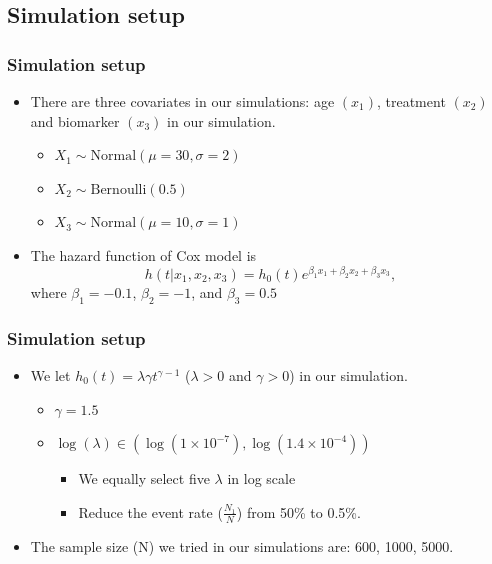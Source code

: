 \documentclass{beamer}
\begin{document}
\subsection{Simulation setup}
	\begin{frame}
		\frametitle{Simulation setup}

      \begin{itemize}
          \item There are three covariates in our simulations: age $(x_1)$, treatment $(x_2)$ and biomarker $(x_3)$ in our simulation.
          \begin{itemize}
              \item $X_1 \sim \mathrm{Normal}(\mu = 30, \sigma = 2)$
              \item $X_2 \sim \mathrm{Bernoulli}(0.5)$   \hspace*{\fill}\\         
              \item $X_3 \sim \mathrm{Normal}(\mu = 10, \sigma = 1)$
          \end{itemize}
      \end{itemize}
      \begin{itemize}
          \item The hazard function of Cox model is 
          \begin{equation*}
              h(t|x_1, x_2, x_3) = h_0(t)e^{\beta_1 x_1 + \beta_2 x_2 + \beta_3 x_3},
          \end{equation*} 
            where $\beta_1=-0.1$, $\beta_2=-1$, and $\beta_3=0.5$
      \end{itemize}
      
	\end{frame}

    \begin{frame}
		\frametitle{Simulation setup}
      
      \begin{itemize}
          \item We let $h_0(t)=\lambda \gamma t^{\gamma-1}$ ($\lambda > 0$ and $\gamma > 0$) in our simulation.
          \begin{itemize}
              \item $\gamma=1.5$ 
              \item $\log(\lambda)\in(\log(1 \times 10^{-7}),\log(1.4 \times 10^{-4}))$
              \begin{itemize}
                  \item We equally select five $\lambda$ in log scale
                  \item Reduce the event rate ($\frac{N_1}{N}$) from 50\% to 0.5\%.
              \end{itemize}
          \end{itemize}          
      \end{itemize}
      \begin{itemize}
          \item The sample size (N) we tried in our simulations are: 600, 1000, 5000.
      \end{itemize}
	\end{frame}
\end{document}
